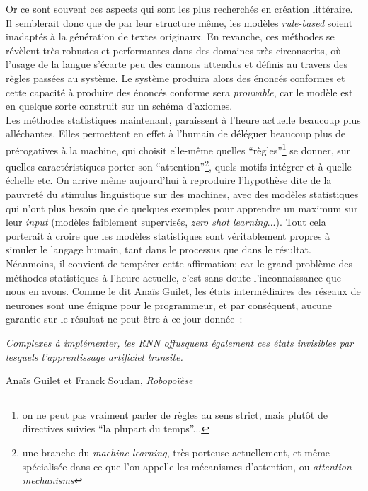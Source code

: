 \documentclass{article}
\newenvironment{citationbox}
{\begin{center}
		\begin{minipage}{.8\textwidth}
		}
		{
		\end{minipage}	
\end{center}
}
\begin{document}
			
			Or ce sont souvent ces aspects qui sont les plus recherchés en création littéraire. Il semblerait donc que de par leur structure même, les modèles \textit{rule-based} soient inadaptés à la génération de textes originaux. En revanche, ces méthodes se révèlent très robustes et performantes dans des domaines très circonscrits, où l'usage de la langue s'écarte peu des cannons attendus et définis au travers des règles passées au système. Le système produira alors des  énoncés conformes et cette capacité à produire des énoncés conforme sera \textit{prouvable}, car le modèle est en quelque sorte construit sur un schéma d'axiomes.\\
				
			Les méthodes statistiques maintenant, paraissent à l'heure actuelle beaucoup plus alléchantes. Elles permettent en effet à l'humain de déléguer beaucoup plus de prérogatives à la machine, qui choisit elle-même quelles ``règles''\footnote{on ne peut pas vraiment parler de règles au sens strict, mais plutôt de directives suivies ``la plupart du temps''...} se donner, sur quelles caractéristiques porter son ``attention''\footnote{une branche du \textit{machine learning}, très porteuse actuellement, et même spécialisée dans ce que l'on appelle les mécanismes d'attention, ou \textit{attention mechanisms}}, quels motifs intégrer et à quelle échelle etc. On arrive même aujourd'hui à reproduire l'hypothèse dite de la pauvreté du stimulus linguistique sur des machines, avec des modèles statistiques qui n'ont plus besoin que de quelques exemples pour apprendre un maximum sur leur \textit{input} (modèles faiblement supervisés, \textit{zero shot learning}...). Tout cela porterait à croire que les modèles statistiques sont véritablement propres à simuler le langage humain, tant dans le processus que dans le résultat. Néanmoins, il convient de tempérer cette affirmation; car le grand problème des méthodes statistiques à l'heure actuelle, c'est sans doute l'inconnaissance que nous en avons. Comme le dit Anaïs Guilet, les états intermédiaires des réseaux de neurones sont une énigme pour le programmeur, et par conséquent, aucune garantie sur le résultat ne peut être à ce jour donnée~:
			\begin{citationbox}
				\textit{Complexes à implémenter, les RNN offusquent également ces états invisibles par lesquels l'apprentissage artificiel transite.}
				\begin{flushright}
					Anaïs Guilet et Franck Soudan, \textit{Robopoïèse} \cite{guilet2017}
				\end{flushright}
			\end{citationbox}
\end{document}
